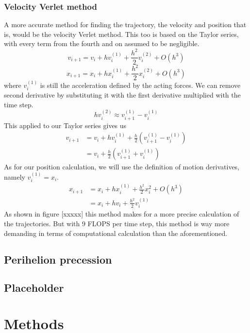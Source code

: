 \documentclass[10pt]{article}
\begin{document}
\begin{multicols}{2}
\subsubsection{Velocity Verlet method}
A more accurate method for finding the trajectory, the velocity and position that is, would be the velocity Verlet method. This too is based on the Taylor series, with every term from the fourth and on assumed to be negligible.
\begin{equation}
    v_{i+1} = v_i +hv_i^{(1)}+\frac{h^2}{2}v_i^{(2)}+O(h^3)
\end{equation}
\begin{equation}
    x_{i+1} = x_i +hx_i^{(1)}+\frac{h^2}{2}x_i^{(2)}+O(h^3)
\end{equation}
where $v_i^{(1)}$ is still the acceleration defined by the acting forces. We can remove second derivative by substituting it with the first derivative multiplied with the time step. 
\begin{equation}
    hv_i^{(2)} \approx v_{i+1}^{(1)}-v_i^{(1)}\nonumber
\end{equation}
This applied to our Taylor series gives us
\begin{align}
    v_{i+1} &= v_i + hv_i^{(1)}+\frac{h}{2}\left(v_{i+1}^{(1)}-v_i^{(1)}\right)\nonumber\\
    &= v_i+\frac{h}{2}\left(v_{i+1}^{(1)}+v_i^{(1)}\right)
\end{align}
As for our position calculation, we will use the definition of motion derivatives, namely $v_i^{(1)}=x_i$.
\begin{align}
    x_{i+1} &= x_i +hx_i^{(1)}+\frac{h^2}{2}x_i^{2}+O(h^3)\nonumber\\
    &= x_i + hv_i + \frac{h^2}{2}v_i^{(1)}
\end{align}
As shown in figure [xxxxx] this method makes for a more precise calculation of the trajectories. But with 9 FLOPS per time step, this method is way more demanding in terms of computational calculation than the aforementioned.

\subsection{Perihelion precession}
\subsection{Placeholder}

\section{Methods}


\end{multicols}
\end{document}
